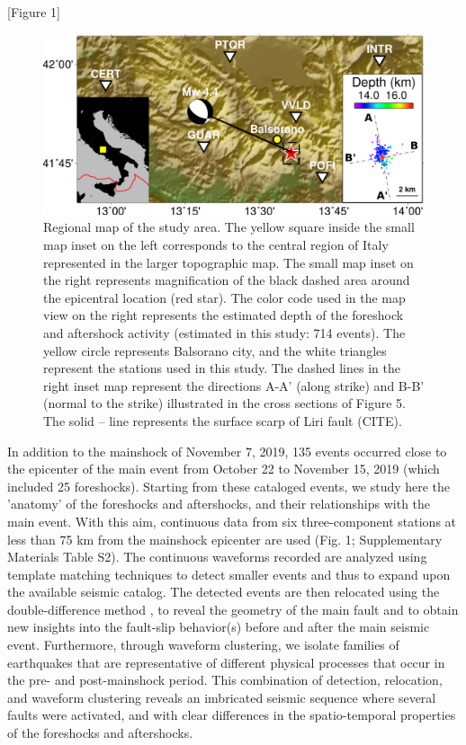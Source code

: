 \documentclass[a4paper,12pt,twoside]{article}
\begin{document}
\begin{center}
   [Figure 1]
\end{center}


\begin{figure}
    \centering
     \includegraphics[width=1\linewidth]{map_balsorano.pdf}
    \caption{Regional map of the study area. The yellow square inside the small map inset on the left corresponds to the central region of Italy represented in the larger topographic map. The small map inset on the right represents magnification of the black dashed area around the epicentral location (red star). The color code used in the map view on the right represents the estimated depth of the foreshock and aftershock activity (estimated in this study: 714 events). The yellow circle represents Balsorano city, and the white triangles represent the stations used in this study. The dashed lines in the right inset map represent the directions A-A' (along strike) and B-B' (normal to the strike) illustrated in the cross sections of Figure 5. The solid -- line represents the surface scarp of Liri fault (CITE).}
\end{figure}    \label{fig:general_map}

In addition to the mainshock of November 7, 2019, 135 events occurred close to the epicenter of the main event from October 22 to November 15, 2019 (which included 25 foreshocks). Starting from these cataloged events, we study here the 'anatomy' of the foreshocks and aftershocks, and their relationships with the main event. With this aim, continuous data from six three-component stations at less than 75 km from the mainshock epicenter are used (Fig. 1; Supplementary Materials Table S2). The continuous waveforms recorded are analyzed using template matching techniques \citep{Gibbons_2006_DLM, Shelly_2007_CET} to detect smaller events and thus to expand upon the available seismic catalog. The detected events are then relocated using the double-difference method \citep{Waldhauser_2001_HDD}, to reveal the geometry of the main fault and to obtain new insights into the fault-slip behavior(s) before and after the main seismic event. Furthermore, through waveform clustering, we isolate families of earthquakes that are representative of different physical processes that occur in the pre- and post-mainshock period. This combination of detection, relocation, and waveform clustering reveals an imbricated seismic sequence where several faults were activated, and with clear differences in the spatio-temporal properties of the foreshocks and aftershocks.
\end{document}
